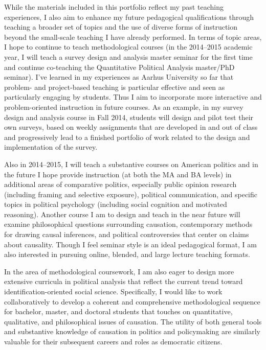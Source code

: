 \documentclass[12pt]{article}
\begin{document}
While the materials included in this portfolio reflect my past teaching experiences, I also aim to enhance my future pedagogical qualifications through teaching a broader set of topics and the use of diverse forms of instruction beyond the small-scale teaching I have already performed. In terms of topic areas, I hope to continue to teach methodological courses (in the 2014--2015 academic year, I will teach a survey design and analysis master seminar for the first time and continue co-teaching the Quantitative Political Analysis master/PhD seminar). I've learned in my experiences as Aarhus University so far that problem- and project-based teaching is particular effective and seen as particularly engaging by students. Thus I aim to incorporate more interactive and problem-oriented instruction in future courses. As an example, in my survey design and analysis course in Fall 2014, students will design and pilot test their own surveys, based on weekly assignments that are developed in and out of class and progressively lead to a finished portfolio of work related to the design and implementation of the survey.

Also in 2014--2015, I will teach a substantive courses on American politics and in the future I hope provide instruction (at both the MA and BA levels) in additional areas of comparative politics, especially public opinion research (including framing and selective exposure), political communication, and specific topics in political psychology (including social cognition and motivated reasoning). Another course I am to design and teach in the near future will examine philosophical questions surrounding causation, contemporary methods for drawing causal inferences, and political controversies that center on claims about causality. Though I feel seminar style is an ideal pedagogical format, I am also interested in pursuing online, blended, and large lecture teaching formats.

In the area of methodological coursework, I am also eager to design more extensive curricula in political analysis that reflect the current trend toward identification-oriented social science. Specifically, I would like to work collaboratively to develop a coherent and comprehensive methodological sequence for bachelor, master, and doctoral students that touches on quantitative, qualitative, and philosophical issues of causation. The utility of both general tools and substantive knowledge of causation in politics and policymaking are similarly valuable for their subsequent careers and roles as democratic citizens.
\end{document}
